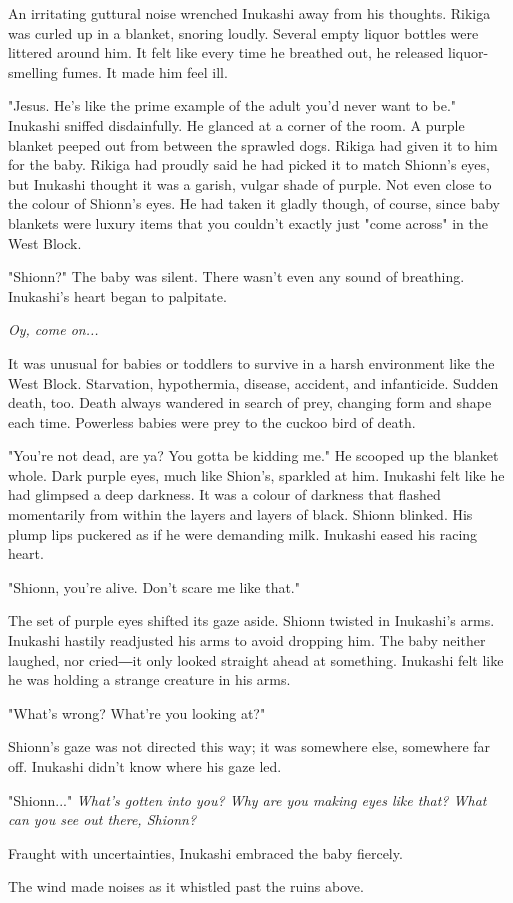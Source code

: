 An irritating guttural noise wrenched Inukashi away from his thoughts.
Rikiga was curled up in a blanket, snoring loudly. Several empty liquor
bottles were littered around him. It felt like every time he breathed
out, he released liquor-smelling fumes. It made him feel ill.

"Jesus. He's like the prime example of the adult you'd never want to
be." Inukashi sniffed disdainfully. He glanced at a corner of the room.
A purple blanket peeped out from between the sprawled dogs. Rikiga had
given it to him for the baby. Rikiga had proudly said he had picked it
to match Shionn's eyes, but Inukashi thought it was a garish, vulgar
shade of purple. Not even close to the colour of Shionn's eyes. He had
taken it gladly though, of course, since baby blankets were luxury items
that you couldn't exactly just "come across" in the West Block.

"Shionn?" The baby was silent. There wasn't even any sound of breathing.
Inukashi's heart began to palpitate.

\emph{Oy, come on...}

It was unusual for babies or toddlers to survive in a harsh environment
like the West Block. Starvation, hypothermia, disease, accident, and
infanticide. Sudden death, too. Death always wandered in search of prey,
changing form and shape each time. Powerless babies were prey to the
cuckoo bird of death.

"You're not dead, are ya? You gotta be kidding me." He scooped up the
blanket whole. Dark purple eyes, much like Shion's, sparkled at him.
Inukashi felt like he had glimpsed a deep darkness. It was a colour of
darkness that flashed momentarily from within the layers and layers of
black. Shionn blinked. His plump lips puckered as if he were demanding
milk. Inukashi eased his racing heart.

"Shionn, you're alive. Don't scare me like that."

The set of purple eyes shifted its gaze aside. Shionn twisted in
Inukashi's arms. Inukashi hastily readjusted his arms to avoid dropping
him. The baby neither laughed, nor cried―it only looked straight ahead
at something. Inukashi felt like he was holding a strange creature in
his arms.

"What's wrong? What're you looking at?"

Shionn's gaze was not directed this way; it was somewhere else,
somewhere far off. Inukashi didn't know where his gaze led.

"Shionn..." \emph{What's gotten into you? Why are you making eyes like that?
What can you see out there, Shionn?}

Fraught with uncertainties, Inukashi embraced the baby fiercely.

The wind made noises as it whistled past the ruins above.